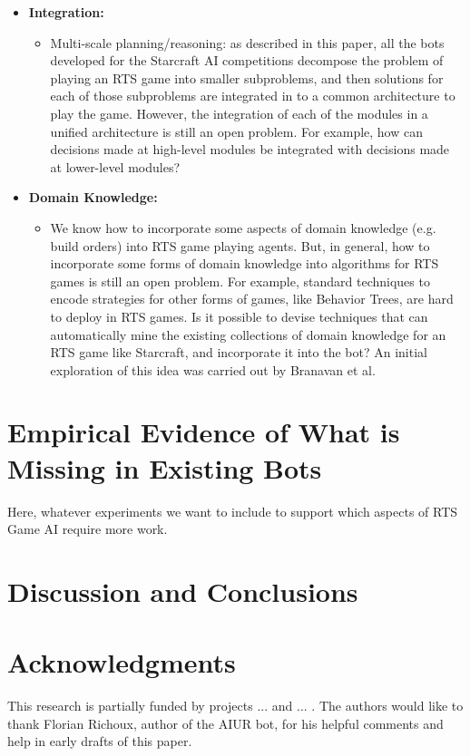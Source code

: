 \documentclass[journal]{IEEEtran}
\begin{document}
\begin{itemize}
\item {\bf Integration:}
\begin{itemize}
\item Multi-scale planning/reasoning: as described in this paper, all the bots developed for the Starcraft AI competitions decompose the problem of playing an RTS game into smaller subproblems, and then solutions for each of those subproblems are integrated in to a common architecture to play the game. However, the integration of each of the modules in a unified architecture is still an open problem. For example, how can decisions made at high-level modules be integrated with decisions made at lower-level modules? 
\end{itemize}

\item {\bf Domain Knowledge: }
\begin{itemize}
\item We know how to incorporate some aspects of domain knowledge (e.g. build orders) into RTS game playing agents. But, in general, how to incorporate some forms of domain knowledge into algorithms for RTS games is still an open problem. For example, standard techniques to encode strategies for other forms of games, like Behavior Trees, are hard to deploy in RTS games. Is it possible to devise techniques that can automatically mine the existing collections of domain knowledge for an RTS game like Starcraft, and incorporate it into the bot? An initial exploration of this idea was carried out by Branavan et al. \cite{???}
\end{itemize}
\end{itemize}



\section{Empirical Evidence of What is Missing in Existing Bots}\label{sec:experiments}

{\color{blue}
Here, whatever experiments we want to include to support which aspects of RTS Game AI require more work.
}

\section{Discussion and Conclusions}\label{sec:conclusions}



\section*{Acknowledgments} {\color{blue} This research is partially funded by projects ... and ... . The authors would like to thank Florian Richoux, author of the AIUR bot, for his helpful comments and help in early drafts of this paper. }
\end{document}
